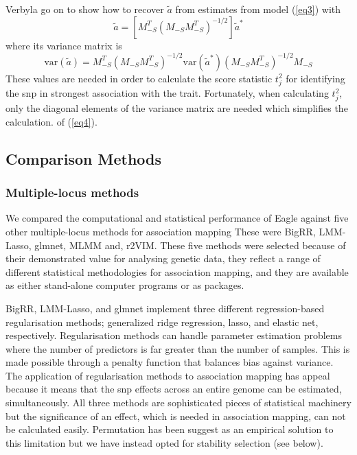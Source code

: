 \documentclass{article}
\begin{document}
Verbyla \cite{verbyla2012rwgaim,verbyla2014whole} go on to show how to recover $\widetilde{a}$ from estimates from model  (\ref{eq3})  with 
\begin{equation}
\widetilde{a} = \left [ M_{-S}^T (M_{-S} M_{-S}^T)^{-1/2} \right ] \widetilde{a}^*
\end{equation}
where its variance matrix is
\begin{equation}
\label{eq4}
\textrm{var}(\widetilde{a}) = M_{-S}^T (M_{-S} M_{-S}^T)^{-1/2} \textrm{var}(\widetilde{a}^*) (M_{-S} M_{-S}^T)^{-1/2} M_{-S}
\end{equation}
These values are needed in order to calculate the score statistic $t_j^2$ for identifying the snp in strongest association with the trait. 
Fortunately, when calculating $t_j^2$, only the diagonal elements of the variance matrix are needed which simplifies the  calculation. 
of (\ref{eq4}). 



\subsection{Comparison Methods}

\subsubsection{Multiple-locus methods}

We compared the computational and statistical performance of Eagle against five other multiple-locus methods for 
association mapping  These were BigRR, LMM-Lasso, glmnet, MLMM  and, r2VIM. 
These five methods were selected because of their demonstrated value 
for analysing genetic data, they reflect a range of different statistical methodologies for association mapping, and they are available as 
either stand-alone computer programs or as  packages.

BigRR, LMM-Lasso, and glmnet  implement three different regression-based regularisation methods; generalized ridge regression, 
lasso, and elastic net, respectively. Regularisation methods can handle parameter estimation problems where the number of predictors is
 far greater than the number of  samples. This is made possible through a penalty function that balances bias against variance. 
The application of regularisation methods to association mapping has appeal because it means that the snp effects across an 
entire genome can be estimated, simultaneously. 
All three methods are sophisticated pieces of statistical machinery but the significance of an effect, which 
is needed in association mapping,  can not be calculated easily. Permutation has been suggest as an empirical solution to this 
limitation \cite{shen2013novel} 
but we have instead opted for stability selection (see below).
\end{document}
